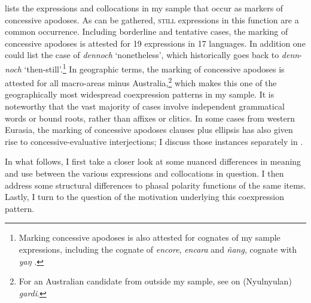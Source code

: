  lists the expressions and collocations in my sample that occur as markers of concessive apodoses. As can be gathered, \textsc{still} expressions in this function are a common occurrence. Including borderline and tentative cases, the marking of concessive apodoses is attested for 19 expressions in 17 languages. In addition one could list the case of  \textit{dennoch} \lq{}nonetheless\rq{}, which historically goes back to \textit{denn}-\textit{noch} \lq then-still\rq{}.\footnote{Marking concessive apodoses is also attested for cognates of my sample expressions, including the  cognate of  \textit{encore}, \textit{encara} \parencite{PerezSaldanyaSalvador1995}
and  \textit{ñang}, cognate with  \textit{yaŋ} \parencite[208–209]{Enfield2007}.} In geographic terms, the marking of concessive apodoses is attested for all macro-areas minus Australia,\footnote{For an Australian candidate from outside my sample, see \textcite[649–651]{Bowern2012} on  (Nyulnyulan) \textit{gardi}.} which makes this one of the geographically most widespread coexpression patterns in my sample. It is noteworthy that the vast majority of cases involve independent grammatical words or bound roots, rather than affixes or clitics. In some cases from western Eurasia, the marking of concessive apodoses clauses plus ellipsis has also given rise to concessive-evaluative interjections;  I discuss those instances separately in .

In what follows, I first take a closer look at some nuanced differences in meaning and use between the various expressions and collocations in question. I then address some structural differences to phasal polarity functions of the same items. Lastly, I turn to the question of the motivation underlying this coexpression pattern.

